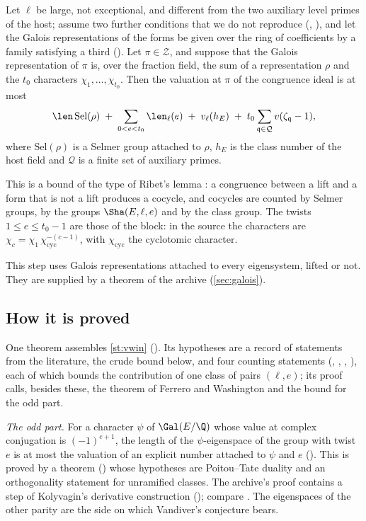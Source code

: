\begin{statement}\label{st:cong}
Let $\ell$ be large, not exceptional, and different from the two auxiliary level primes of
the host; assume two further conditions that we do not reproduce (,
), and let the Galois representations of the forms be given over the ring of
coefficients by a family satisfying a third (). Let
$\pi\in\mathcal Z$, and suppose that the Galois
representation of $\pi$ is, over the fraction field, the sum of a representation $\rho$ and the
$t_0$ characters $\chi_1,\dots,\chi_{t_0}$. Then the valuation at $\pi$ of the
congruence ideal is at most
\[
\len\,\mathrm{Sel}(\rho)\;+\;\sum_{0<e<t_0}\len_\ell(e)\;+\;v_\ell(h_E)\;+\;t_0\sum_{\mathfrak q\in\mathcal Q}v(\zeta_{\mathfrak q}-1),
\]
where $\mathrm{Sel}(\rho)$ is a Selmer group attached to $\rho$, $h_E$ is the class number of
the host field and $\mathcal Q$ is a finite set of auxiliary primes.
\end{statement}
This is a bound of the type of Ribet's lemma \cite{ribet1976}: a congruence between a lift and
a form that is not a lift produces a cocycle, and cocycles are counted by Selmer groups, by the
groups $\Sha(E,\ell,e)$ and by the class group. The twists $1\le e\le t_0-1$ are those of the
block: in the source the characters are $\chi_c=\chi_1\,\chi_{\mathrm{cyc}}^{-(c-1)}$, with
$\chi_{\mathrm{cyc}}$ the cyclotomic character.

This step uses Galois representations attached to every eigensystem, lifted or not. They are
supplied by a theorem of the archive (\cref{sec:galois}).

\subsection{How it is proved}
One theorem assembles \cref{st:vwin} \lvS{} (). Its hypotheses are a record
of statements from the literature, the crude bound  below, and four counting
statements (, , , ), each of which
bounds the contribution of one class of pairs $(\ell,e)$; its proof calls, besides these, the
theorem of Ferrero and Washington and the bound for the odd part.

\emph{The odd part.} For a character $\psi$ of $\Gal(E/\Q)$ whose value at complex conjugation
is $(-1)^{e+1}$, the length of the $\psi$-eigenspace of the group with twist $e$ is at most the
valuation of an explicit number attached to $\psi$ and $e$ (). This is proved
by a theorem \lvS{} () whose hypotheses are Poitou--Tate duality and an
orthogonality statement for unramified classes. The archive's proof contains a step of
Kolyvagin's derivative construction (); compare
\cite{kolyvagin1990,rubin2000}. The eigenspaces of the other parity are the side on which
Vandiver's conjecture bears.

